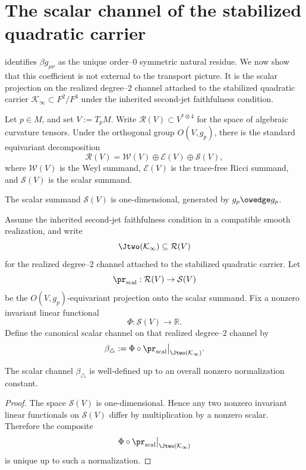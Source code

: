 \section{The scalar channel of the stabilized quadratic carrier}
\label{sec:einstein-scalar}
 identifies \(\beta g_{\mu\nu}\) as the unique
order--\(0\) symmetric natural residue.
We now show that this coefficient is not external to the transport
picture.
It is the scalar projection on the realized degree--\(2\) channel
attached to the stabilized quadratic carrier
\(\mathcal K_\infty\subset F^2/F^3\) under the inherited second-jet
faithfulness condition.
\begin{definition}
	Let \(p\in M\), and set \(V:=T_pM\).
	Write \(\mathcal R(V)\subset V^{*\otimes 4}\) for the space of
	algebraic curvature tensors.
	Under the orthogonal group \(O(V,g_p)\), there is the standard
	equivariant decomposition
	\[
		\mathcal R(V)
		=
		\mathcal W(V)\oplus \mathcal E(V)\oplus \mathcal S(V),
	\]
	where \(\mathcal W(V)\) is the Weyl summand, \(\mathcal E(V)\) is the
	trace-free Ricci summand, and \(\mathcal S(V)\) is the scalar summand.
\end{definition}
\begin{remark}
	The scalar summand \(\mathcal S(V)\) is one-dimensional, generated by
	\(g_p\owedge g_p\).
\end{remark}
\begin{definition}
	Assume the inherited second-jet faithfulness condition in a compatible
	smooth realization, and write
	\[
		\Jtwo(\mathcal K_\infty)\subseteq \mathcal R(V)
	\]
	for the realized degree--\(2\) channel attached to the stabilized
	quadratic carrier.
	Let
	\[
		\pr_{\mathrm{scal}}:\mathcal R(V)\to \mathcal S(V)
	\]
	be the \(O(V,g_p)\)-equivariant projection onto the scalar summand.
	Fix a nonzero invariant linear functional
	\[
		\Phi:\mathcal S(V)\to\mathbb R.
	\]
	Define the canonical scalar channel on that realized degree--\(2\)
	channel by
	\[
		\beta_\triangle
		:=
		\Phi\circ \pr_{\mathrm{scal}}\big|_{\Jtwo(\mathcal K_\infty)}.
	\]
\end{definition}
\begin{lemma}
	The scalar channel \(\beta_\triangle\) is well-defined up to an overall
	nonzero normalization constant.
\end{lemma}
\begin{proof}
	The space \(\mathcal S(V)\) is one-dimensional.
	Hence any two nonzero invariant linear functionals on \(\mathcal S(V)\)
	differ by multiplication by a nonzero scalar.
	Therefore the composite
	\[
		\Phi\circ \pr_{\mathrm{scal}}\big|_{\Jtwo(\mathcal K_\infty)}
	\]
	is unique up to such a normalization.
\end{proof}
